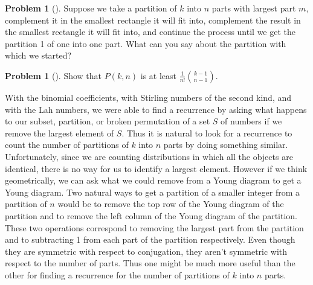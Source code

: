 \documentclass[10pt,]{book}
\theoremstyle{plain}
\theoremstyle{definition}
\newtheorem{activity}[project]{Problem}
\theoremstyle{definition}
\numberwithin{equation}{chapter}
\newcommand{\importantarrow}{\Rightarrow}
\begin{document}
\begin{activity}[]\marginsymbol[-1em]{\pdftooltip{$\importantarrow$}{especially interesting}} \label{activity-169}
Suppose we take a partition of \(k\) into \(n\) parts with largest part \(m\), complement it in the smallest rectangle it will fit into, complement the result in the smallest rectangle it will fit into, and continue the process until we get the partition 1 of one into one part.  What can you say about the partition with which we started?%
\end{activity}
\begin{activity}[]\marginsymbol[-1em]{} \label{activity-170}
Show that \(P(k,n)\) is at least \(\frac{1}{n!}\binom{k-1}{n-1}\).%
\end{activity}
With the binomial coefficients, with Stirling numbers of the second kind, and with the Lah numbers, we were able to find a recurrence by asking what happens to our subset, partition, or broken permutation of a set \(S\) of numbers if we remove the largest element of \(S\). Thus it is natural to look for a recurrence to count the number of partitions of \(k\) into \(n\) parts by doing something similar. Unfortunately, since we are counting distributions in which all the objects are identical, there is no way for us to identify a largest element. However if we think geometrically, we can ask what we could remove from a Young diagram to get a Young diagram. Two natural ways to get a partition of a smaller integer from a partition of \(n\) would be to remove the top row of the Young diagram of the partition and to remove the left column of the Young diagram of the partition. These two operations correspond to removing the largest part from the partition and to subtracting 1 from each part of the partition respectively. Even though they are symmetric with respect to conjugation, they aren't symmetric with respect to the number of parts. Thus one might be much more useful than the other for finding a recurrence for the number of partitions of \(k\) into \(n\) parts.%
\end{document}
